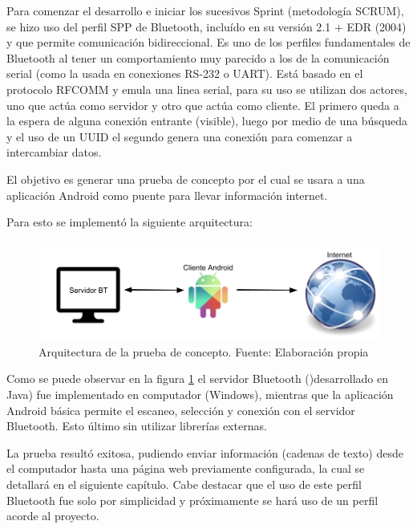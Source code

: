 Para comenzar el desarrollo e iniciar los sucesivos Sprint (metodología SCRUM), se hizo uso del perfil SPP de Bluetooth, incluído en su versión 2.1 + EDR (2004) y que permite comunicación bidireccional. Es uno de los perfiles fundamentales de Bluetooth al tener un comportamiento muy parecido a los de la comunicación serial (como la usada en conexiones RS-232 o UART).
Está basado en el protocolo RFCOMM y emula una linea serial, para su uso se utilizan dos actores, uno que actúa como servidor y otro que actúa como cliente. El primero queda a la espera de alguna conexión entrante (visible), luego por medio de una búsqueda y el uso de un UUID el segundo genera una conexión para comenzar a intercambiar datos.

El objetivo es generar una prueba de concepto por el cual se usara a una aplicación Android como puente para llevar información internet.

Para esto se implementó la siguiente arquitectura:

\begin{figure}[H]
	\centering
	\includegraphics[scale=0.4]{figuras/comunicacion/prueba.png}
	\caption{Arquitectura de la prueba de concepto. Fuente: Elaboración propia}
	\label{prueba_concept}
\end{figure}

Como se puede observar en la figura \ref{prueba_concept} el servidor Bluetooth ()desarrollado en Java) fue implementado en computador (Windows), mientras que la aplicación Android básica permite el escaneo, selección y conexión con el servidor Bluetooth. Esto último sin utilizar librerías externas.

La prueba resultó exitosa, pudiendo enviar información (cadenas de texto) desde el computador hasta una página web previamente configurada, la cual se detallará en el siguiente capítulo. Cabe destacar que el uso de este perfil Bluetooth fue solo por simplicidad y próximamente se hará uso de un perfil acorde al proyecto.